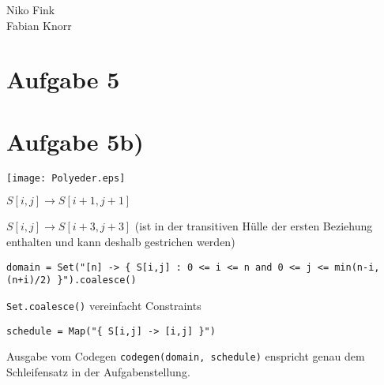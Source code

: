 \documentclass[a4paper,10pt]{article}
\begin{document}
\begin{flushright}
    Niko Fink\\
    Fabian Knorr
\end{flushright}
\vspace*{-5.5em}

\section*{Aufgabe 5}
\section*{Aufgabe 5b)}

\texttt{[image: Polyeder.eps]}

$S[i,j]\rightarrow S[i+1,j+1]$

$S[i,j]\rightarrow S[i+3,j+3]$ (ist in der transitiven Hülle der ersten Beziehung enthalten und kann deshalb gestrichen werden)

\texttt{domain = Set("[n] -> \{ S[i,j] : 0 <= i <= n and 0 <= j <= min(n-i, (n+i)/2) \}").coalesce()}

\texttt{Set.coalesce()} vereinfacht Constraints

\texttt{schedule = Map("\{ S[i,j] -> [i,j] \}")}

Ausgabe vom Codegen \texttt{codegen(domain, schedule)} enspricht genau dem Schleifensatz in der Aufgabenstellung.
\end{document}
